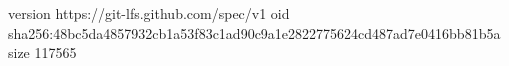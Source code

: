 version https://git-lfs.github.com/spec/v1
oid sha256:48bc5da4857932cb1a53f83c1ad90c9a1e2822775624cd487ad7e0416bb81b5a
size 117565

